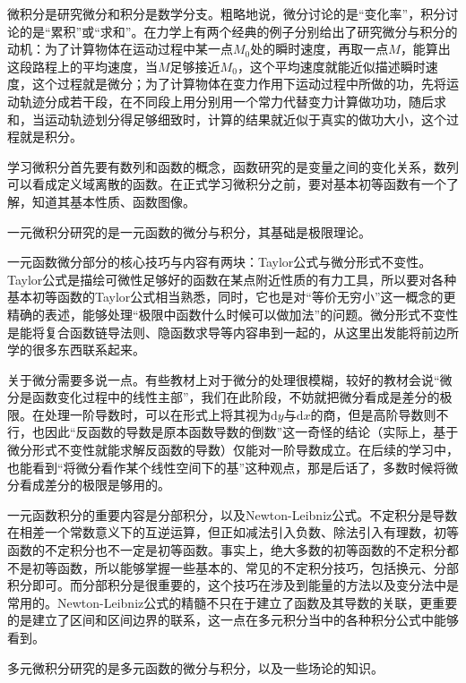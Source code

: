 微积分是研究微分和积分是数学分支。粗略地说，微分讨论的是“变化率”，积分讨论的是“累积”或“求和”。在力学上有两个经典的例子分别给出了研究微分与积分的动机：为了计算物体在运动过程中某一点$M_0$处的瞬时速度，再取一点$M$，能算出这段路程上的平均速度，当$M$足够接近$M_0$，这个平均速度就能近似描述瞬时速度，这个过程就是微分；为了计算物体在变力作用下运动过程中所做的功，先将运动轨迹分成若干段，在不同段上用分别用一个常力代替变力计算做功功，随后求和，当运动轨迹划分得足够细致时，计算的结果就近似于真实的做功大小，这个过程就是积分。

学习微积分首先要有数列和函数的概念，函数研究的是变量之间的变化关系，数列可以看成定义域离散的函数。在正式学习微积分之前，要对基本初等函数有一个了解，知道其基本性质、函数图像。

一元微积分研究的是一元函数的微分与积分，其基础是极限理论。

一元函数微分部分的核心技巧与内容有两块：Taylor公式与微分形式不变性。Taylor公式是描绘可微性足够好的函数在某点附近性质的有力工具，所以要对各种基本初等函数的Taylor公式相当熟悉，同时，它也是对“等价无穷小”这一概念的更精确的表述，能够处理“极限中函数什么时候可以做加法”的问题。微分形式不变性是能将复合函数链导法则、隐函数求导等内容串到一起的，从这里出发能将前边所学的很多东西联系起来。

关于微分需要多说一点。有些教材上对于微分的处理很模糊，较好的教材会说“微分是函数变化过程中的线性主部”，我们在此阶段，不妨就把微分看成是差分的极限。在处理一阶导数时，可以在形式上将其视为$\mathrm{d}y$与$\mathrm{d}x$的商，但是高阶导数则不行，也因此“反函数的导数是原本函数导数的倒数”这一奇怪的结论（实际上，基于微分形式不变性就能求解反函数的导数）仅能对一阶导数成立。在后续的学习中，也能看到“将微分看作某个线性空间下的基”这种观点，那是后话了，多数时候将微分看成差分的极限是够用的。

一元函数积分的重要内容是分部积分，以及Newton-Leibniz公式。不定积分是导数在相差一个常数意义下的互逆运算，但正如减法引入负数、除法引入有理数，初等函数的不定积分也不一定是初等函数。事实上，绝大多数的初等函数的不定积分都不是初等函数，所以能够掌握一些基本的、常见的不定积分技巧，包括换元、分部积分即可。而分部积分是很重要的，这个技巧在涉及到能量的方法以及变分法中是常用的。Newton-Leibniz公式的精髓不只在于建立了函数及其导数的关联，更重要的是建立了区间和区间边界的联系，这一点在多元积分当中的各种积分公式中能够看到。

多元微积分研究的是多元函数的微分与积分，以及一些场论的知识。

